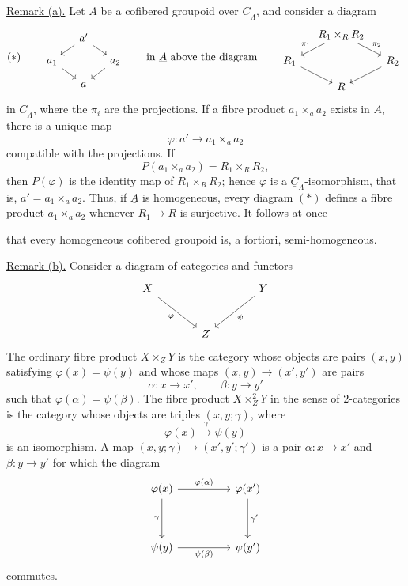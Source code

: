 \underline{Remark (a).} Let $\underline A$ be a cofibered
groupoid over $\underline C_\Lambda$, and consider a diagram
\[
(*)\qquad
\begin{tikzcd}[row sep=small,column sep=small]
 & a' \arrow[dl] \arrow[dr] & \\
 a_1 \arrow[dr] & & a_2 \arrow[dl]\\
 & a &
\end{tikzcd}
\qquad\text{in $\underline A$ above the diagram}\qquad
\begin{tikzcd}[row sep=small,column sep=small]
 & R_1\times_R R_2 \arrow[dl,"{\pi_1}"'] \arrow[dr,"{\pi_2}"] & \\
 R_1 \arrow[dr] & & R_2 \arrow[dl]\\
 & R &
\end{tikzcd}
\]
in $\underline C_\Lambda$, where the $\pi_i$ are the projections.
If a fibre product $a_1\times_a a_2$ exists in $\underline A$,
there is a unique map
\[
 \varphi:a'\longrightarrow a_1\times_a a_2
\]
compatible with the projections. If
\[
 P(a_1\times_a a_2)=R_1\times_R R_2,
\]
then $P(\varphi)$ is the identity map of $R_1\times_R R_2$;
hence $\varphi$ is a $\underline C_\Lambda$-isomorphism, that is,
$a'=a_1\times_a a_2$. Thus, if $\underline A$ is homogeneous,
every diagram $(*)$ defines a fibre product $a_1\times_a a_2$
whenever $R_1\longrightarrow R$ is surjective. It follows at once


that every homogeneous cofibered groupoid is, a fortiori,
semi-homogeneous.

\underline{Remark (b).} Consider a diagram of categories and
functors
\[
\begin{tikzcd}[row sep=large,column sep=large]
 X \arrow[dr,"{\varphi}"'] & & Y \arrow[dl,"{\psi}"]\\
 & Z &
\end{tikzcd}
\]
The ordinary fibre product $X\times_ZY$ is the category whose
objects are pairs $(x,y)$ satisfying $\varphi(x)=\psi(y)$ and whose
maps $(x,y)\longrightarrow(x',y')$ are pairs
\[
 \alpha:x\longrightarrow x',\qquad
 \beta:y\longrightarrow y'
\]
such that $\varphi(\alpha)=\psi(\beta)$. The fibre product
$X\times_Z^2Y$ in the sense of $2$-categories is the category whose
objects are triples $(x,y;\gamma)$, where
\[
 \varphi(x)\xrightarrow{\ \gamma\ }\psi(y)
\]
is an isomorphism. A map
$(x,y;\gamma)\longrightarrow(x',y';\gamma')$ is a pair
$\alpha:x\longrightarrow x'$ and $\beta:y\longrightarrow y'$ for
which the diagram
\[
\begin{tikzcd}[row sep=huge,column sep=huge]
 \varphi(x) \arrow[r,"{\varphi(\alpha)}"] \arrow[d,"{\gamma}"']
 & \varphi(x') \arrow[d,"{\gamma'}"]\\
 \psi(y) \arrow[r,"{\psi(\beta)}"'] & \psi(y')
\end{tikzcd}
\]
commutes.

